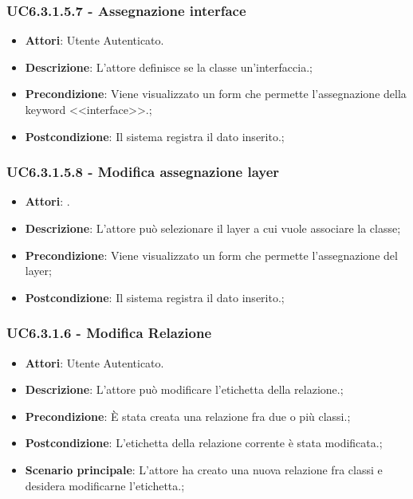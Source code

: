 \subsubsection{UC6.3.1.5.7 - Assegnazione interface} 
\label{sssec:UC6.3.1.5.7} 
\begin{itemize} 
\item \textbf{Attori}: Utente Autenticato.
\item \textbf{Descrizione}: L'attore definisce se la classe un'interfaccia.;
\item \textbf{Precondizione}: Viene visualizzato un form che permette l'assegnazione della keyword <<interface>>.;
\item \textbf{Postcondizione}: Il sistema registra il dato inserito.;
\end{itemize} 
\subsubsection{UC6.3.1.5.8 - Modifica assegnazione layer} 
\label{sssec:UC6.3.1.5.8} 
\begin{itemize} 
\item \textbf{Attori}: .
\item \textbf{Descrizione}: L'attore può selezionare il layer a cui vuole associare la classe;
\item \textbf{Precondizione}: Viene visualizzato un form che permette l'assegnazione del layer;
\item \textbf{Postcondizione}: Il sistema registra il dato inserito.;
\end{itemize} 
\subsubsection{UC6.3.1.6 - Modifica Relazione} 
\label{sssec:UC6.3.1.6} 
\begin{itemize} 
\item \textbf{Attori}: Utente Autenticato.
\item \textbf{Descrizione}: L'attore può modificare l'etichetta della relazione.;
\item \textbf{Precondizione}: È stata creata una relazione fra due o più classi.;
\item \textbf{Postcondizione}: L'etichetta della relazione corrente è stata modificata.;
\item \textbf{Scenario principale}: L'attore ha creato una nuova relazione fra classi e desidera modificarne l'etichetta.;\end{itemize} 
